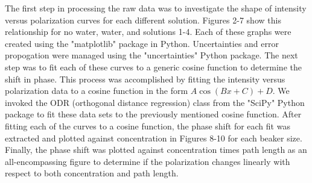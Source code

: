 
The first step in processing the raw data was to investigate the shape of intensity versus polarization curves for each different solution. Figures 2-7 show this relationship for no water, water, and solutions 1-4. Each of these graphs were created using the "matplotlib" package in Python. Uncertainties and error propogation were managed using the "uncertainties" Python package. 
The next step was to fit each of these curves to a generic cosine function to determine the shift in phase. This process was accomplished by fitting the intensity versus polarization data to a cosine function in the form $A\cos{\left(Bx+C\right)}+D$. We invoked the ODR (orthogonal distance regression) class from the "SciPy" Python package to fit these data sets to the previously mentioned cosine function.
After fitting each of the curves to a cosine function, the phase shift for each fit was extracted and plotted against concentration in Figures 8-10 for each beaker size.
Finally, the phase shift was plotted against concentration times path length as an all-encompassing figure to determine if the polarization changes linearly with respect to both concentration and path length.
